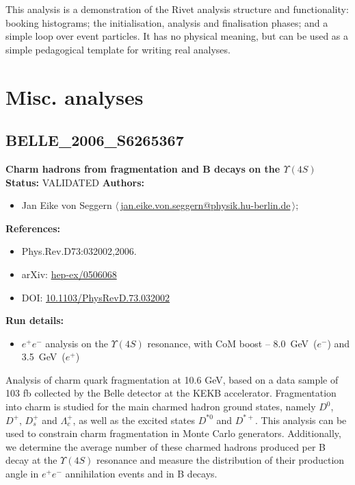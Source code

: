 \noindent This analysis is a demonstration of the Rivet analysis structure and functionality: booking histograms; the initialisation, analysis and finalisation phases; and a simple loop over event particles. It has no physical meaning, but can be used as a simple pedagogical template for writing real analyses.

\clearpage


\section{Misc. analyses}
\subsection{BELLE\_2006\_S6265367}
\textbf{Charm hadrons from fragmentation and B decays on the $\Upsilon(4S)$}\newline
\textbf{Status:} VALIDATED\newline
\textbf{Authors:}
\begin{itemize}
  \item Jan Eike von Seggern $\langle\,$\href{mailto:jan.eike.von.seggern@physik.hu-berlin.de}{jan.eike.von.seggern@physik.hu-berlin.de}$\,\rangle$;
\end{itemize}
\textbf{References:}
\begin{itemize}
  \item Phys.Rev.D73:032002,2006.
  \item arXiv: \href{http://arxiv.org/abs/hep-ex/0506068}{hep-ex/0506068}
  \item DOI: \href{http://dx.doi.org/10.1103/PhysRevD.73.032002}{10.1103/PhysRevD.73.032002}
\end{itemize}
\textbf{Run details:}
\begin{itemize}

  \item $e^+ e^-$ analysis on the $\Upsilon(4S)$ resonance, with CoM boost -- 8.0~GeV~($e^−$) and 3.5~GeV~($e^+$)\end{itemize}

\noindent Analysis of charm quark fragmentation at 10.6 GeV, based on a data sample of 103 fb collected by the Belle detector at the KEKB accelerator.  Fragmentation into charm is studied for the main charmed hadron ground states,  namely $D^0$, $D^+$, $D^+_s$ and $\Lambda_c^+$, as well as the excited states  $D^{*0}$ and $D^{*+}$. This analysis can be used to constrain charm fragmentation  in Monte Carlo generators. Additionally, we determine the average number of these charmed hadrons produced per B decay at the $\Upsilon(4S)$ resonance and measure the distribution of their production angle in $e^+ e^-$ annihilation  events and in B decays.


